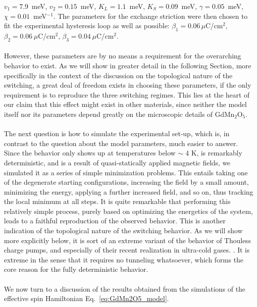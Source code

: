 $v_1 = 7.9$~meV, $v_2 = 0.15$~meV, $K_L = 1.1$~meV, $K_S = 0.09$~meV, $\gamma = 0.05$~meV, $\chi=0.01$~meV$^{-1}$.
The parameters for the exchange striction were then chosen to fit the experimental hysteresis loop as well as possible:
${\beta_1 = 0.06\,\mu}$C/cm$^2$, $\beta_2 = 0.06\:\mu$C/cm$^2$, $\beta_3 = 0.04\:\mu$C/cm$^2$.
\\\\
However, these parameters are by no means a requirement for the overarching behavior to exist. As we will show in greater detail in the following Section, more specifically in the context of the discussion on the topological nature of the switching, a great deal of freedom exists in choosing these parameters, if the only requirement is to reproduce the three switching regimes.
This lies at the heart of our claim that this effect might exist in other materials, since neither the model itself nor its parameters depend greatly on the microscopic details of GdMn$_2$O$_5$. 
\\\\
The next question is how to simulate the experimental set-up, which is, in contrast to the question about the model parameters, much easier to answer.
Since the behavior only shows up at temperatures below $\sim$ 4 K, is remarkably deterministic, and is a result of quasi-statically applied magnetic fields, we simulated it as a series of simple minimization problems.
This entails taking one of the degenerate starting configurations, increasing the field by a small amount, minimizing the energy, applying a further increased field, and so on, thus tracking the local minimum at all steps.
It is quite remarkable that performing this relatively simple process, purely based on optimizing the energetics of the system, leads to a faithful reproduction of the observed behavior.
This is another indication of the topological nature of the switching behavior.
As we will show more explicitly below, it is sort of an extreme variant of the behavior of Thouless charge pumps, and especially of their recent realization in ultra-cold gases. \cite{Rice82,Thouless1982,Thouless83,Lohse16,Nakajima16, Atala13}.
It is extreme in the sense that it requires no tunneling whatsoever, which forms the core reason for the fully deterministic behavior.
\\\\

We now turn to a discussion of the results obtained from the simulations of the effective spin Hamiltonian Eq.~\eqref{eq:GdMn2O5_model}.

